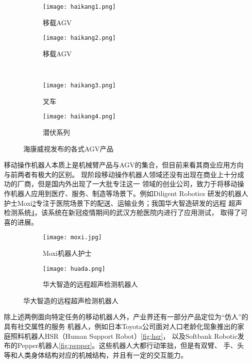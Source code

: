\begin{figure}
\centering
\begin{subfigure}{.4\textwidth}
  \centering
  \texttt{[image: haikang1.png]}
  \caption{移载AGV}
\end{subfigure}%
\begin{subfigure}{.4\textwidth}
  \centering
  \texttt{[image: haikang2.png]}
  \caption{移载AGV}
\end{subfigure}%
\\
\begin{subfigure}{.4\textwidth}
  \centering
  \texttt{[image: haikang3.png]}
  \caption{叉车}
\end{subfigure}%
\begin{subfigure}{.4\textwidth}
  \centering
  \texttt{[image: haikang4.png]}
  \caption{潜伏系列}
\end{subfigure}%
\caption{海康威视发布的各式AGV产品}
\label{fig:haikang}
\end{figure}

移动操作机器人本质上是机械臂产品与AGV的集合，但目前来看其商业应用方向与前两者有极大的区别。
现阶段移动操作机器人领域还没有出现在商业上十分成功的厂商，但是国内外出现了一大批专注这一
领域的创业公司，致力于将移动操作机器人应用到医疗、服务、制造等场景下。例如Diligent Robotics
研发的机器人护士Moxi\ref{fig:moxi}专注于医院场景下的配送、运输业务；我国华大智造研发的远程
超声检测系统\ref{fig:huada}，该系统在新冠疫情期间的武汉方舱医院内进行了应用测试\cite{wushengzheng20205g}，
取得了可喜的进展。

\begin{figure}
\centering
\begin{subfigure}{.5\textwidth}
  \centering
  \texttt{[image: moxi.jpg]}
  \caption{Moxi机器人护士}
  \label{fig:moxi}
\end{subfigure}%
\begin{subfigure}{.5\textwidth}
  \centering
  \texttt{[image: huada.png]}
  \caption{华大智造的远程超声检测机器人}
  \label{fig:huada}
\end{subfigure}%
\end{figure}

除上述两例面向特定任务的移动机器人外，产业界还有一部分产品定位为“仿人”的具有社交属性的服务
机器人，例如日本Toyota公司面对人口老龄化现象推出的家庭照料机器人HSR（Human Support Robot）\ref{fig:hsr}，
以及Softbank Robotic发布的Pepper机器人\ref{fig:pepper}。这些机器人大都行动笨拙，但是有双臂、
手、头等和人类身体结构对应的机械结构，并且有一定的交互能力。

